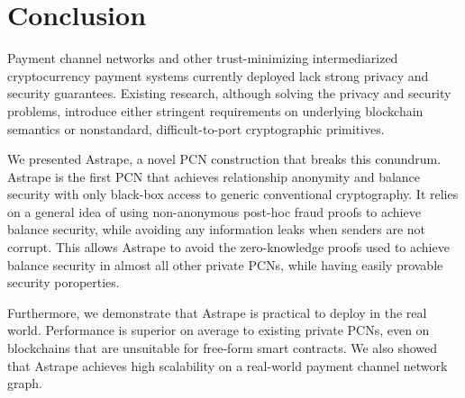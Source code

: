 \documentclass[USenglish,oneside,twocolumn]{article}
\begin{document}

\section{Conclusion} \label{sec:conclusion}

Payment channel networks and other trust-minimizing intermediarized cryptocurrency payment systems currently deployed lack strong privacy and security guarantees. Existing research, although solving the privacy and security problems, introduce either stringent requirements on underlying blockchain semantics or nonstandard, difficult-to-port cryptographic primitives.

We presented Astrape, a novel PCN construction that breaks this conundrum. Astrape is the first PCN that achieves relationship anonymity and balance security with only black-box access to generic conventional cryptography. It relies on a general idea of using non-anonymous post-hoc fraud proofs to achieve balance security, while avoiding any information leaks when senders are not corrupt. This allows Astrape to avoid the zero-knowledge proofs used to achieve balance security in almost all other private PCNs, while having easily provable security poroperties.

Furthermore, we demonstrate that Astrape is practical to deploy in the real world. Performance is superior on average to existing private PCNs, even on blockchains that are unsuitable for free-form smart contracts. We also showed that Astrape achieves high scalability on a real-world payment channel network graph.

{}



\end{document}
